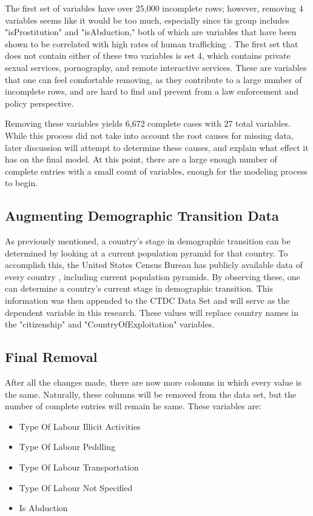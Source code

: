 \documentclass{article} %
\begin{document}
The first set of variables have over 25,000 incomplete rows; however, removing 4 variables seems like it would be too much, especially since tis group includes "isProstitution" and "isAbduction," both of which are variables that have been shown to be correlated with high rates of human trafficking \parencite{SlaveBook, polarisTypology}. The first set that does not contain either of these two variables is set 4, which contains private sexual services, pornography, and remote interactive services. These are variables that one can feel comfortable removing, as they contribute to a large number of incomplete rows, and are hard to find and prevent from a law enforcement and policy perspective.

Removing these variables yields 6,672 complete cases with 27 total variables. While this process did not take into account the root causes for missing data, later discussion will attempt to determine these causes, and explain what effect it has on the final model. At this point, there are a large enough number of complete entries with a small count of variables, enough for the modeling process to begin.

\subsection{Augmenting Demographic Transition Data}

As previously mentioned, a country's stage in demographic transition can be determined by looking at a current population pyramid for that country. To accomplish this, the United States Census Bureau has publicly available data of every country \parencite{USCB}, including current population pyramids. By observing these, one can determine a country's current stage in demographic transition. This information was then appended to the CTDC Data Set and will serve as the dependent variable in this research. These values will replace country names in the "citizenship" and "CountryOfExploitation" variables.

\subsection{Final Removal}

After all the changes made, there are now more colomns in which every value is the same. Naturally, these columns will be removed from the data set, but the number of complete entries will remain he same. These variables are:

\begin{itemize}
	\item Type Of Labour Illicit Activities
	\item Type Of Labour Peddling	
	\item Type Of Labour Transportation
	\item Type Of Labour Not Specified
	\item Is Abduction		
\end{itemize}
\end{document}
